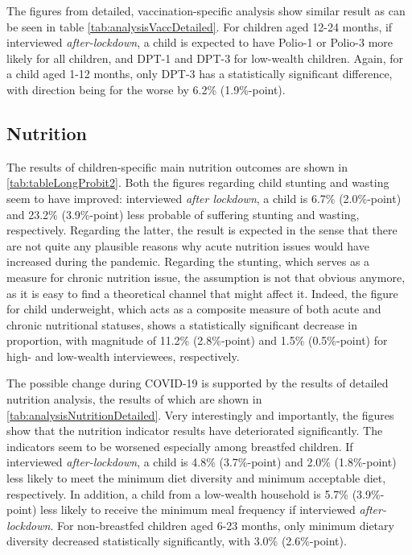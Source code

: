 \documentclass[12pt,a4paper,notitlepage]{article}
\begin{document}
The figures from detailed, vaccination-specific analysis show similar result as can be seen in table \cref{tab:analysisVaccDetailed}. For children aged 12-24 months, if interviewed \textit{after-lockdown}, a child is expected to have Polio-1 or Polio-3 more likely for all children, and DPT-1 and DPT-3 for low-wealth children. Again, for a child aged 1-12 months, only DPT-3 has a statistically significant difference, with direction being for the worse by 6.2\% (1.9\%-point).

\subsection{Nutrition} \label{subsec:resultsNutrition}

The results of children-specific main nutrition outcomes are shown in \cref{tab:tableLongProbit2}. Both the figures regarding child stunting and wasting seem to have improved: interviewed \textit{after lockdown}, a child is 6.7\% (2.0\%-point) and 23.2\% (3.9\%-point) less probable of suffering stunting and wasting, respectively. Regarding the latter, the result is expected in the sense that there are not quite any plausible reasons why acute nutrition issues would have increased during the pandemic. Regarding the stunting, which serves as a measure for chronic nutrition issue, the assumption is not that obvious anymore, as it is easy to find a theoretical channel that might affect it. Indeed, the figure for child underweight, which acts as a composite measure of both acute and chronic nutritional statuses, shows a statistically significant decrease in proportion, with magnitude of 11.2\% (2.8\%-point) and 1.5\% (0.5\%-point) for high- and low-wealth interviewees, respectively. 

The possible change during COVID-19 is supported by the results of detailed nutrition analysis, the results of which are shown in \cref{tab:analysisNutritionDetailed}. Very interestingly and importantly, the figures show that the nutrition indicator results have deteriorated significantly. The indicators seem to be worsened especially among breastfed children. If interviewed \textit{after-lockdown}, a child is 4.8\% (3.7\%-point) and 2.0\% (1.8\%-point) less likely to meet the minimum diet diversity and minimum acceptable diet, respectively. In addition, a child from a low-wealth household is 5.7\% (3.9\%-point) less likely to receive the minimum meal frequency if interviewed \textit{after-lockdown}. For non-breastfed children aged 6-23 months, only minimum dietary diversity decreased statistically significantly, with 3.0\% (2.6\%-point).
\end{document}
